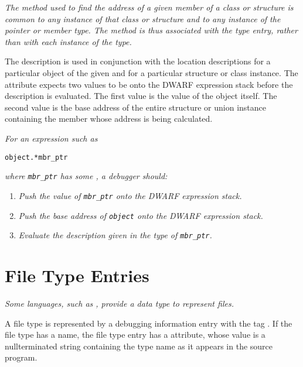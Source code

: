 \textit{The method used to find the address of a given member of a
class or structure is common to any instance of that class
or structure and to any instance of the pointer or member
type. The method is thus associated with the type entry,
rather than with each instance of the type.}

The  description is used in conjunction
with the location descriptions for a particular object of the
given  and for a particular structure or
class instance. The  
attribute expects two values to be 
onto the DWARF expression stack before
the  description is evaluated.
The first value 
is the value of the  object
itself. The second value 
is the base address of the
entire structure or union instance containing the member
whose address is being calculated.

\textit{For an expression such as}

\begin{lstlisting}[numbers=none]
    object.*mbr_ptr
\end{lstlisting}
\textit{where \texttt{mbr\_ptr} has some , a debugger should:}
\begin{enumerate}
\item \textit{Push the value of \texttt{mbr\_ptr} onto the DWARF expression stack.}
\item \textit{Push the base address of \texttt{object} onto the DWARF expression stack.}
\item \textit{Evaluate the  description 
given in the type of \texttt{mbr\_ptr}.}
\end{enumerate}


\section{File Type Entries}
\label{chap:filetypeentries}

\textit{Some languages, such as , 
provide a data type to represent 
files.}

A file type is represented by a debugging information entry
with 
the tag
. 
If the file type has a name,
the file type entry has a  attribute,
whose value
is a null\dash terminated string containing the type name as it
appears in the source program.

